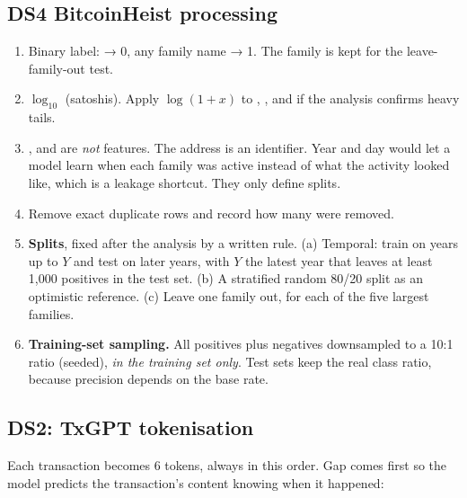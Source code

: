 \subsection{DS4 BitcoinHeist processing}

\begin{enumerate}
  \item Binary label:  → 0, any family name → 1. The family is kept for the
    leave-family-out test.
  \item $\log_{10}$  (satoshis). Apply $\log(1+x)$ to , ,
     and  if the analysis confirms heavy tails.
  \item {},  and  are \emph{not} features. The address is an
    identifier. Year and day would let a model learn when each family was active instead of what
    the activity looked like, which is a leakage shortcut. They only define splits.
  \item Remove exact duplicate rows and record how many were removed.
  \item \textbf{Splits}, fixed after the analysis by a written rule. (a) Temporal: train on years
    up to $Y$ and test on later years, with $Y$ the latest year that leaves at least 1,000
    positives in the test set. (b) A stratified random 80/20 split as an optimistic reference.
    (c) Leave one family out, for each of the five largest families.
  \item \textbf{Training-set sampling.} All positives plus negatives downsampled to a 10:1 ratio
    (seeded), \emph{in the training set only}. Test sets keep the real class ratio, because
    precision depends on the base rate.
\end{enumerate}

\subsection{DS2: TxGPT tokenisation}
\label{sec:txtokens}

Each transaction becomes 6 tokens, always in this order. Gap comes first so the model predicts
the transaction's content knowing when it happened:


